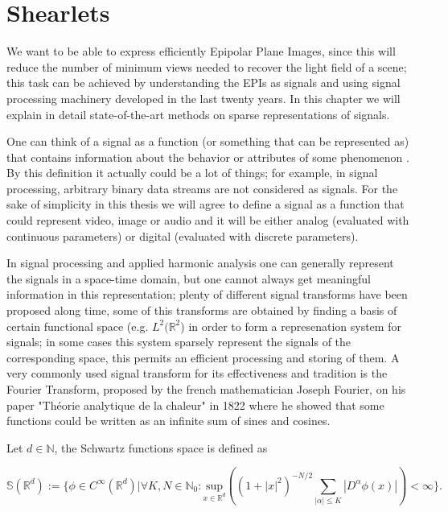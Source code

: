 \chapter{Shearlets}

We want to be able to express efficiently Epipolar Plane Images, since this will reduce the number of minimum views needed to recover the light field of a scene; this task can be achieved by understanding the EPIs as signals and using signal processing machinery developed in the last twenty years. In this chapter we will explain in detail state-of-the-art methods on sparse representations of signals.

\bigskip

One can think of a signal as a function (or something that can be represented as) that contains information about the behavior or attributes of some phenomenon \cite{Roland}. By this definition it actually could be a lot of things; for example, in signal processing, arbitrary binary data streams are not considered as signals. For the sake of simplicity in this thesis we will agree to define a signal as a function that could represent video, image or audio and it will be either analog (evaluated with continuous parameters) or digital (evaluated with discrete parameters). 

\bigskip

In signal processing and applied harmonic analysis one can generally represent the signals in a space-time domain, but one cannot always get meaningful information in this representation; plenty of different signal transforms have been proposed along time, some of this transforms are obtained by finding a basis of certain functional space (e.g. $L^2(\mathbb{R}^2$) in order to form a represenation system for signals; in some cases this system sparsely represent the signals of the corresponding space, this permits an efficient processing and storing of them. A very commonly used signal transform for its effectiveness and tradition is the Fourier Transform, proposed by the french mathematician Joseph Fourier, on his paper "Théorie analytique de la chaleur" in 1822 where he showed that some functions could be written as an infinite sum of sines and cosines.

\bigskip

Let $d\in \mathbb{N}$, the Schwartz functions space is defined as 

$$
\mathbb{S}(\mathbb{R}^d):=\{\phi\in C^{\infty}(\mathbb{R}^d)|\forall K,N\in\mathbb{N}_0: \underset{x\in\mathbb{R}^d}{\text{sup}}((1+|x|^2)^{-N/2}\sum_{|\alpha|\leq K} |D^{\alpha}\phi(x)|)<\infty\}.
$$

